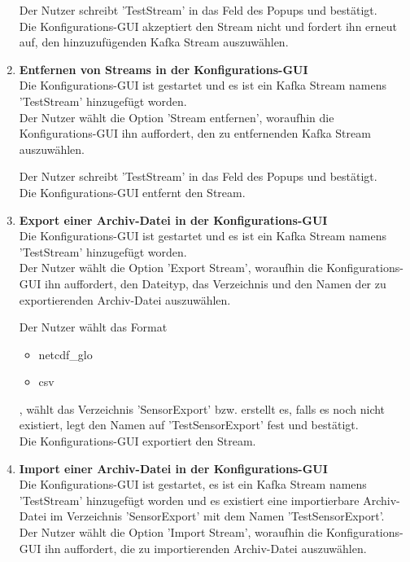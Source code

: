 \begin{enumerate}[label=\textbf{TI\arabic{enumi}0}]
		Der Nutzer schreibt 'TestStream' in das Feld des Popups und bestätigt.\\
		Die Konfigurations-GUI akzeptiert den Stream nicht und fordert ihn erneut auf, den hinzuzufügenden Kafka Stream auszuwählen.
	\item \textbf{Entfernen von Streams in der Konfigurations-GUI}\\
		Die Konfigurations-GUI ist gestartet und es ist ein Kafka Stream namens 'TestStream' hinzugefügt worden.\\
		Der Nutzer wählt die Option 'Stream entfernen', woraufhin die Konfigurations-GUI ihn auffordert, den zu entfernenden Kafka Stream auszuwählen.\par
		
		Der Nutzer schreibt 'TestStream' in das Feld des Popups und bestätigt.\\
		Die Konfigurations-GUI entfernt den Stream.
	\item \textbf{Export einer Archiv-Datei in der Konfigurations-GUI}\\
		Die Konfigurations-GUI ist gestartet und es ist ein Kafka Stream namens 'TestStream' hinzugefügt worden.\\
		Der Nutzer wählt die Option 'Export Stream', woraufhin die Konfigurations-GUI ihn auffordert, den Dateityp, das Verzeichnis und den Namen der zu exportierenden Archiv-Datei auszuwählen.\par
		
		Der Nutzer wählt das Format
		\begin{itemize}
		\item \gls{netcdf_glo}
		\item \gls{csv}
		\end{itemize}
		, wählt das Verzeichnis 'SensorExport' bzw. erstellt es, falls es noch nicht existiert, legt den Namen auf 'TestSensorExport' fest und bestätigt.\\
		Die Konfigurations-GUI exportiert den Stream.
	\item \textbf{Import einer Archiv-Datei in der Konfigurations-GUI}\\
		Die Konfigurations-GUI ist gestartet, es ist ein Kafka Stream namens 'TestStream' hinzugefügt worden und es existiert eine importierbare Archiv-Datei im Verzeichnis 'SensorExport' mit dem Namen 'TestSensorExport'.\\
		Der Nutzer wählt die Option 'Import Stream', woraufhin die Konfigurations-GUI ihn auffordert, die zu importierenden Archiv-Datei auszuwählen.\par
		

\end{enumerate}
